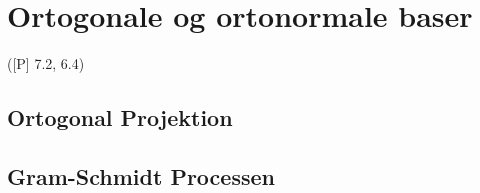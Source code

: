 \newpage
\chapter{Ortogonale og ortonormale baser}
([P] 7.2, 6.4)

\section{Ortogonal Projektion}
\hypertarget{6.1.14}{}

\section{Gram-Schmidt Processen}


